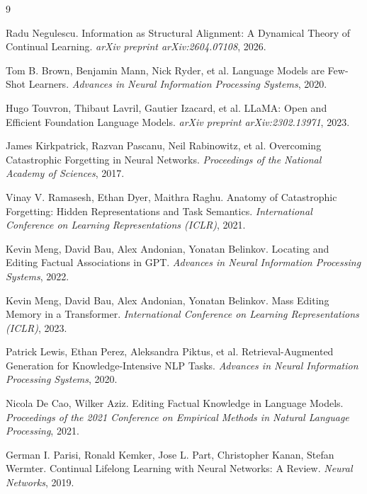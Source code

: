 \documentclass[11pt,twocolumn]{article}
\theoremstyle{plain}
\begin{document}
\begin{thebibliography}{9}

Radu Negulescu.
\newblock Information as Structural Alignment: A Dynamical Theory of Continual Learning.
\newblock \textit{arXiv preprint arXiv:2604.07108}, 2026.

Tom B. Brown, Benjamin Mann, Nick Ryder, et al.
\newblock Language Models are Few-Shot Learners.
\newblock \textit{Advances in Neural Information Processing Systems}, 2020.

Hugo Touvron, Thibaut Lavril, Gautier Izacard, et al.
\newblock LLaMA: Open and Efficient Foundation Language Models.
\newblock \textit{arXiv preprint arXiv:2302.13971}, 2023.

James Kirkpatrick, Razvan Pascanu, Neil Rabinowitz, et al.
\newblock Overcoming Catastrophic Forgetting in Neural Networks.
\newblock \textit{Proceedings of the National Academy of Sciences}, 2017.

Vinay V. Ramasesh, Ethan Dyer, Maithra Raghu.
\newblock Anatomy of Catastrophic Forgetting: Hidden Representations and Task Semantics.
\newblock \textit{International Conference on Learning Representations (ICLR)}, 2021.

Kevin Meng, David Bau, Alex Andonian, Yonatan Belinkov.
\newblock Locating and Editing Factual Associations in GPT.
\newblock \textit{Advances in Neural Information Processing Systems}, 2022.

Kevin Meng, David Bau, Alex Andonian, Yonatan Belinkov.
\newblock Mass Editing Memory in a Transformer.
\newblock \textit{International Conference on Learning Representations (ICLR)}, 2023.

Patrick Lewis, Ethan Perez, Aleksandra Piktus, et al.
\newblock Retrieval-Augmented Generation for Knowledge-Intensive NLP Tasks.
\newblock \textit{Advances in Neural Information Processing Systems}, 2020.

Nicola De Cao, Wilker Aziz.
\newblock Editing Factual Knowledge in Language Models.
\newblock \textit{Proceedings of the 2021 Conference on Empirical Methods in Natural Language Processing}, 2021.

German I. Parisi, Ronald Kemker, Jose L. Part, Christopher Kanan, Stefan Wermter.
\newblock Continual Lifelong Learning with Neural Networks: A Review.
\newblock \textit{Neural Networks}, 2019.

\end{thebibliography}
\end{document}
